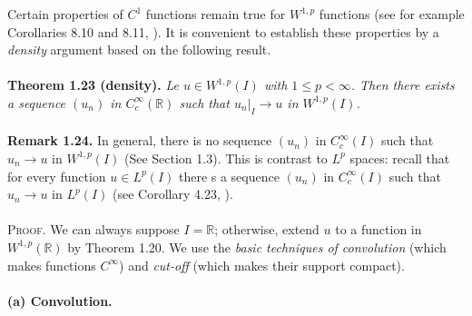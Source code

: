 \documentclass[a4paper,oneside]{book}
\numberwithin{equation}{chapter}
\begin{document}
Certain properties of $C^1$ functions remain true for $W^{1,p}$ functions (see for example Corollaries 8.10 and 8.11, \cite{1}). It is convenient to establish these properties by a \textit{density} argument based on the following result.\\
\\
\textbf{Theorem 1.23 (density).} \textit{Le $u\in W^{1,p}\left(I\right)$ with $1\le p<\infty$. Then there exists a sequence $\left(u_n\right)$ in $C_c^{\infty}\left(\mathbb{R}\right)$ such that ${\left. {{u_n}} \right|_I} \to u$ in $W^{1,p}\left(I\right)$.}\\
\\
\textbf{Remark 1.24.} In general, there is no sequence $\left(u_n\right)$ in $C_c^{\infty}\left(I\right)$ such that $u_n\to u$ in $W^{1,p}\left(I\right)$ (See Section 1.3). This is contrast to $L^p$ spaces: recall that for every function $u\in L^p\left(I\right)$ there s a sequence $\left(u_n\right)$ in $C_c^{\infty}\left(I\right)$ such that $u_n\to u$ in $L^p\left(I\right)$ (see Corollary 4.23, \cite{1}).\\
\\
\textsc{Proof.} We can always suppose $I=\mathbb{R}$; otherwise, extend $u$ to a function in $W^{1,p}\left(\mathbb{R}\right)$ by Theorem 1.20. We use the \textit{basic techniques of convolution} (which makes functions $C^{\infty}$) and \textit{cut-off} (which makes their support compact).\\
\\
\textbf{(a) Convolution.}
\end{document}
